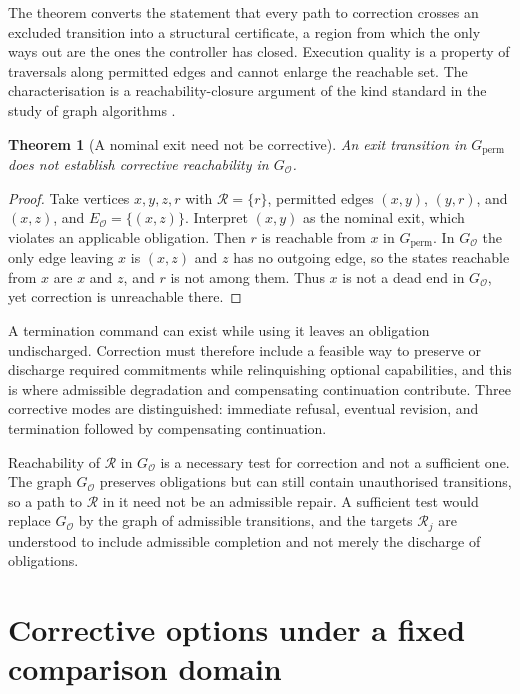 \documentclass[11pt]{article}
\newtheorem{theorem}{Theorem}
\theoremstyle{definition}
\theoremstyle{remark}
\begin{document}
The theorem converts the statement that every path to correction crosses an excluded transition into a structural certificate, a region from which the only ways out are the ones the controller has closed. Execution quality is a property of traversals along permitted edges and cannot enlarge the reachable set. The characterisation is a reachability-closure argument of the kind standard in the study of graph algorithms \cite{clrs2022}.

\begin{theorem}[A nominal exit need not be corrective]\label{thm:nominal}
An exit transition in $G_{\mathrm{perm}}$ does not establish corrective reachability in $G_{\mathcal O}$.
\end{theorem}
\begin{proof}
Take vertices $x,y,z,r$ with $\mathcal R=\{r\}$, permitted edges $(x,y)$, $(y,r)$, and $(x,z)$, and $E_{\mathcal O}=\{(x,z)\}$. Interpret $(x,y)$ as the nominal exit, which violates an applicable obligation. Then $r$ is reachable from $x$ in $G_{\mathrm{perm}}$. In $G_{\mathcal O}$ the only edge leaving $x$ is $(x,z)$ and $z$ has no outgoing edge, so the states reachable from $x$ are $x$ and $z$, and $r$ is not among them. Thus $x$ is not a dead end in $G_{\mathcal O}$, yet correction is unreachable there. \qedhere
\end{proof}

A termination command can exist while using it leaves an obligation undischarged. Correction must therefore include a feasible way to preserve or discharge required commitments while relinquishing optional capabilities, and this is where admissible degradation and compensating continuation contribute. Three corrective modes are distinguished: immediate refusal, eventual revision, and termination followed by compensating continuation.

Reachability of $\mathcal R$ in $G_{\mathcal O}$ is a necessary test for correction and not a sufficient one. The graph $G_{\mathcal O}$ preserves obligations but can still contain unauthorised transitions, so a path to $\mathcal R$ in it need not be an admissible repair. A sufficient test would replace $G_{\mathcal O}$ by the graph of admissible transitions, and the targets $\mathcal R_j$ are understood to include admissible completion and not merely the discharge of obligations.

\section{Corrective options under a fixed comparison domain}
\end{document}
